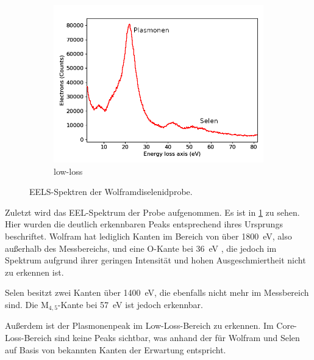 \begin{figure}[H]
\begin{subfigure}[b]{0.7\textwidth}
				\includegraphics[width= 1 \linewidth]{img/tem_mark}
				\caption{low-loss}
	\end{subfigure}
		\caption{
      EELS-Spektren der Wolframdiselenidprobe.
			}
    \label{fig:eels}
	\end{figure}

  Zuletzt wird das EEL-Spektrum der Probe aufgenommen.
  Es ist in \cref{fig:eels} zu sehen.
  Hier wurden die deutlich erkennbaren Peaks entsprechend ihres Ursprungs beschriftet.
  Wolfram hat lediglich Kanten im Bereich von über \SI{1800}{eV}, also außerhalb des Messbereichs, und eine O-Kante bei \SI{36}{eV} \cite{eelsinfo}, die jedoch im Spektrum aufgrund ihrer geringen Intensität und hohen Ausgeschmiertheit nicht zu erkennen ist.

  Selen besitzt zwei Kanten über \SI{1400}{eV}, die ebenfalls nicht mehr im Messbereich sind.
  Die M$_{4,5}$-Kante bei \SI{57}{eV} ist jedoch erkennbar.

  Außerdem ist der Plasmonenpeak im Low-Loss-Bereich zu erkennen.
  Im Core-Loss-Bereich sind keine Peaks sichtbar, was anhand der für Wolfram und Selen auf Basis von \cite{eelsinfo} bekannten Kanten der Erwartung entspricht.



